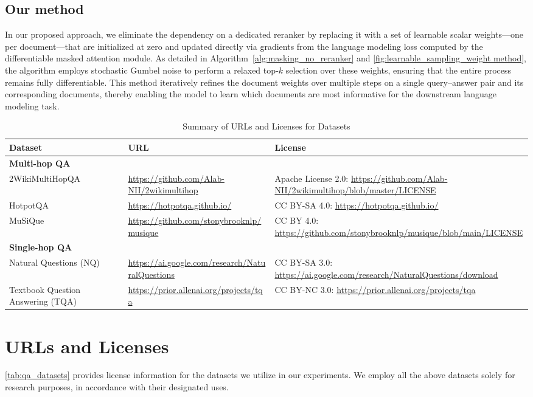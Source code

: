 \subsection{Our method}
In our proposed approach, we eliminate the dependency on a dedicated reranker by replacing it with a set of learnable scalar weights—one per document—that are initialized at zero and updated directly via gradients from the language modeling loss computed by the differentiable masked attention module. As detailed in Algorithm~\ref{alg:masking_no_reranker} and \autoref{fig:learnable_sampling_weight method}, the algorithm employs stochastic Gumbel noise to perform a relaxed top‑$k$ selection over these weights, ensuring that the entire process remains fully differentiable. This method iteratively refines the document weights over multiple steps on a single query–answer pair and its corresponding documents, thereby enabling the model to learn which documents are most informative for the downstream language modeling task.

\begin{table*}[!th]
\small
\centering
\begin{tabular}{p{5cm} p{5cm} p{4cm}}
\toprule
\textbf{Dataset} & \textbf{URL} & \textbf{License} \\
\midrule
\textbf{Multi-hop QA} & & \\
2WikiMultiHopQA~\cite{DBLP:conf/coling/HoNSA20} & \url{https://github.com/Alab-NII/2wikimultihop} & Apache License 2.0: \url{https://github.com/Alab-NII/2wikimultihop/blob/master/LICENSE} \\
HotpotQA~\cite{DBLP:conf/emnlp/Yang0ZBCSM18} & \url{https://hotpotqa.github.io/} & CC BY-SA 4.0: \url{https://hotpotqa.github.io/} \\
MuSiQue~\cite{DBLP:journals/tacl/TrivediBKS22} & \url{https://github.com/stonybrooknlp/musique} & CC BY 4.0: \url{https://github.com/stonybrooknlp/musique/blob/main/LICENSE} \\
\midrule
\textbf{Single-hop QA} & & \\
Natural Questions (NQ)~\cite{DBLP:journals/tacl/KwiatkowskiPRCP19} & \url{https://ai.google.com/research/NaturalQuestions} & CC BY-SA 3.0: \url{https://ai.google.com/research/NaturalQuestions/download} \\
Textbook Question Answering (TQA)~\cite{DBLP:conf/acl/KimKK19} & \url{https://prior.allenai.org/projects/tqa} & CC BY-NC 3.0: \url{https://prior.allenai.org/projects/tqa} \\
\bottomrule
\end{tabular}
\caption{Summary of URLs and Licenses for Datasets}
\label{tab:qa_datasets}
\end{table*}

\section{URLs and Licenses}
\autoref{tab:qa_datasets} provides license information for the datasets we utilize in our experiments. We employ all the above datasets solely for research purposes, in accordance with their designated uses.
